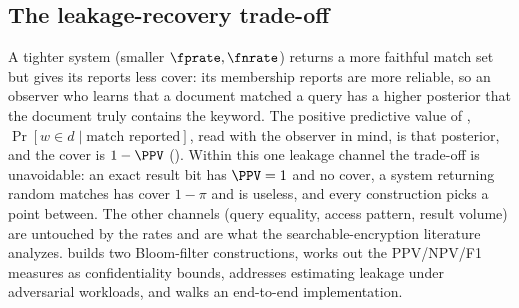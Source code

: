 \subsection*{The leakage-recovery trade-off}

A tighter system (smaller $\fprate, \fnrate$) returns a more faithful
match set but gives its reports less cover: its membership reports are
more reliable, so an observer who learns that a document matched a query
has a higher posterior that the document truly contains the keyword. The
positive predictive value of , $\Pr[w \in d \mid
\text{match reported}]$, read with the observer in mind, is that
posterior, and the cover is $1 - \PPV$
(). Within this one leakage channel
the trade-off is unavoidable: an exact result bit has $\PPV = 1$ and no
cover, a system returning random matches has cover $1 - \pi$ and is
useless, and every construction picks a point between. The other channels
(query equality, access pattern, result volume) are untouched by the
rates and are what the searchable-encryption literature analyzes.
 builds two Bloom-filter constructions,
 works out the PPV/NPV/F1 measures as
confidentiality bounds,  addresses
estimating leakage under adversarial workloads, and
 walks an end-to-end implementation.

